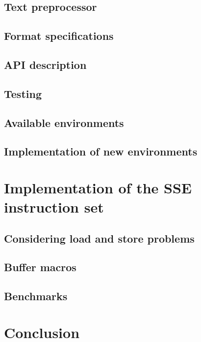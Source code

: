     \section{Text preprocessor} 

    \section{Format specifications}

      

    \section{API description} 

    \section{Testing} 

    \section{Available environments} 

    \section{Implementation of new environments} 

\chapter{Implementation of the SSE instruction set}
    \label{ch:sse}

    

    \section{Considering load and store problems}  

    \section{Buffer macros} 

    \section{Benchmarks} 

\chapter{Conclusion}
  \label{ch:conc}
 
    

%
%


